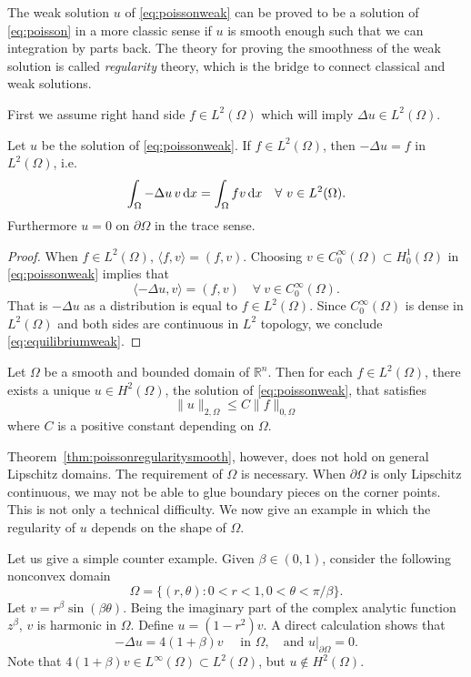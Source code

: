 The weak solution $u$ of \eqref{eq:poissonweak} can be proved to be a solution of \eqref{eq:poisson} in a
more classic sense if $u$ is smooth enough such that we can integration by parts back. The
theory for proving the smoothness of the weak solution is called {\it regularity} theory, which
is the bridge to connect classical and weak solutions.

First we assume right hand side $f\in L^2(\Omega)$ which will imply $\Delta u\in L^2(\Omega)$.
\begin{theorem}
Let $u$ be the solution of \eqref{eq:poissonweak}. If $f\in L^2(\Omega)$, then $-\Delta u = f$ in $L^2(\Omega)$, i.e.
\begin{equation}\label{eq:equilibriumweak}
\int_{\Omega}-\Delta u \,v\,{\rm d}x=\int_{\Omega}fv\,{\rm d}x\quad\forall~v\in L^2(\Omega).
\end{equation}
Furthermore $u = 0$ on $\partial\Omega$ in the trace sense.
\end{theorem}
\begin{proof}
When $f\in L^2(\Omega)$, $\langle f, v\rangle = (f, v)$. Choosing $v\in C_0^{\infty}(\Omega)\subset H_0^1(\Omega)$ in \eqref{eq:poissonweak} implies that
\[
\langle-\Delta u, v\rangle = (f, v)\quad\forall~v\in C_0^{\infty}(\Omega).
\]
That is $-\Delta u$ as a distribution is equal to $f\in L^2(\Omega)$. Since $C_0^{\infty}(\Omega)$ is dense in $L^2(\Omega)$ and
both sides are continuous in $L^2$ topology, we conclude \eqref{eq:equilibriumweak}.
\end{proof}

\begin{theorem}\label{thm:poissonregularitysmooth}
Let $\Omega$ be a smooth and bounded domain of $\mathbb R^n$. Then for each $f \in L^2(\Omega)$,
there exists a unique $u\in H^2(\Omega)$, the solution of \eqref{eq:poissonweak}, that satisfies
\[
\|u\|_{2,\Omega}\leq C\|f\|_{0,\Omega}
\]
where $C$ is a positive constant depending on $\Omega$.
\end{theorem}

Theorem~\ref{thm:poissonregularitysmooth}, however, does not hold on general Lipschitz domains.
The requirement of $\Omega$ is necessary. When $\partial\Omega$ is only Lipschitz continuous, we may not
be able to glue boundary pieces on the corner points. This is not only a technical difficulty.
We now give an example in which the regularity of $u$ depends on the shape of $\Omega$.
\begin{exm}
Let us give a simple counter example. Given $\beta\in (0, 1)$, consider the
following nonconvex domain
\[
\Omega=\{(r, \theta): 0<r<1, 0<\theta<\pi/\beta\}.
\]
Let $v = r^{\beta}\sin(\beta\theta)$. Being the imaginary part of the complex analytic function $z^{\beta}$, $v$ is
harmonic in $\Omega$. Define $u = (1-r^2)v$. A direct calculation shows that
\[
-\Delta u=4(1+\beta)v\quad\textrm{  in }\Omega,\quad\textrm{and } u|_{\partial\Omega}=0.
\]
Note that $4(1+\beta)v\in L^{\infty}(\Omega)\subset L^2(\Omega)$, but $u\notin H^2(\Omega)$.
\end{exm}

